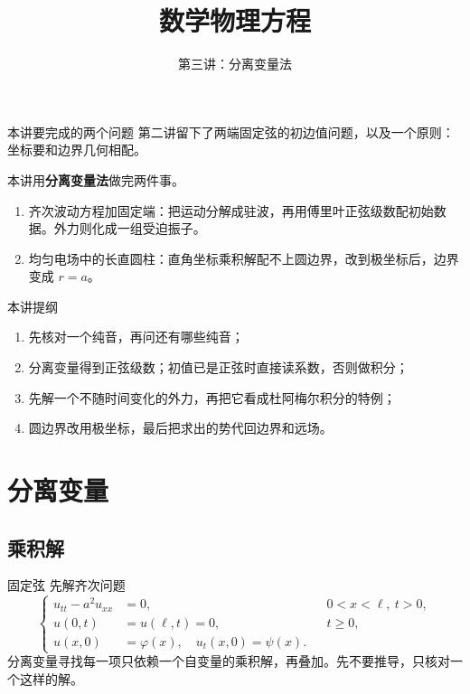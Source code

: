 \documentclass[fontset=windows, chinese, 10pt, xcolor=dvipsnames]{beamer}
\title{数学物理方程}
\subtitle{第三讲：分离变量法}
\begin{document}
\begin{frame}
  \titlepage
\end{frame}

\begin{frame}{本讲要完成的两个问题}
  第二讲留下了两端固定弦的初边值问题，以及一个原则：坐标要和边界几何相配。
  \vspace{0.4em}

  本讲用\textbf{分离变量法}做完两件事。
  \begin{enumerate}
    \item 齐次波动方程加固定端：把运动分解成驻波，再用傅里叶正弦级数配初始数据。外力则化成一组受迫振子。
    \item 均匀电场中的长直圆柱：直角坐标乘积解配不上圆边界，改到极坐标后，边界变成 $r=a$。
  \end{enumerate}
\end{frame}

\begin{frame}{本讲提纲}
  \begin{enumerate}
    \item 先核对一个纯音，再问还有哪些纯音；
    \item 分离变量得到正弦级数；初值已是正弦时直接读系数，否则做积分；
    \item 先解一个不随时间变化的外力，再把它看成杜阿梅尔积分的特例；
    \item 圆边界改用极坐标，最后把求出的势代回边界和远场。
  \end{enumerate}
\end{frame}

\section{分离变量}

\subsection{乘积解}

\begin{frame}{固定弦}
  先解齐次问题
  \begin{equation*}
    \left\{
    \begin{aligned}
      u_{tt}-a^2u_{xx}&=0, && 0<x<\ell,\ t>0,\\
      u(0,t)&=u(\ell,t)=0, && t\geq 0,\\
      u(x,0)&=\varphi(x),\quad u_t(x,0)=\psi(x).
    \end{aligned}
    \right.
  \end{equation*}
  分离变量寻找每一项只依赖一个自变量的乘积解，再叠加。先不要推导，只核对一个这样的解。
\end{frame}
\end{document}
